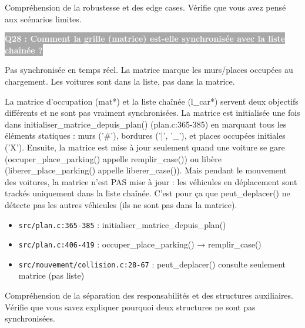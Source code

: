 \documentclass[12pt,a4paper]{article}
\newcommand{\question}[1]{%
    \vspace{0.5cm}
    \noindent\colorbox{darkgray}{\textcolor{white}{\textbf{#1}}}
    \vspace{0.3cm}
}
\begin{document}
\begin{objectif_prof}
Compréhension de la robustesse et des edge cases. Vérifie que vous avez pensé aux scénarios limites.
\end{objectif_prof}

\question{Q28 : Comment la grille (matrice) est-elle synchronisée avec la liste chaînée ?}

\begin{reponse_courte}
Pas synchronisée en temps réel. La matrice marque les murs/places occupées au chargement. Les voitures sont dans la liste, pas dans la matrice.
\end{reponse_courte}

\begin{reponse_longue}
La matrice d'occupation (mat*) et la liste chaînée (l\_car*) servent deux objectifs différents et ne sont pas vraiment synchronisées. La matrice est initialisée une fois dans initialiser\_matrice\_depuis\_plan() (plan.c:365-385) en marquant tous les éléments statiques : murs ('\#'), bordures ('|', '\_'), et places occupées initiales ('X'). Ensuite, la matrice est mise à jour seulement quand une voiture se gare (occuper\_place\_parking() appelle remplir\_case()) ou libère (liberer\_place\_parking() appelle liberer\_case()). Mais pendant le mouvement des voitures, la matrice n'est PAS mise à jour : les véhicules en déplacement sont trackés uniquement dans la liste chaînée. C'est pour ça que peut\_deplacer() ne détecte pas les autres véhicules (ils ne sont pas dans la matrice).
\end{reponse_longue}

\begin{reference_code}
\begin{itemize}
    \item \texttt{src/plan.c:365-385} : initialiser\_matrice\_depuis\_plan()
    \item \texttt{src/plan.c:406-419} : occuper\_place\_parking() → remplir\_case()
    \item \texttt{src/mouvement/collision.c:28-67} : peut\_deplacer() consulte seulement matrice (pas liste)
\end{itemize}
\end{reference_code}

\begin{objectif_prof}
Compréhension de la séparation des responsabilités et des structures auxiliaires. Vérifie que vous savez expliquer pourquoi deux structures ne sont pas synchronisées.
\end{objectif_prof}
\end{document}
